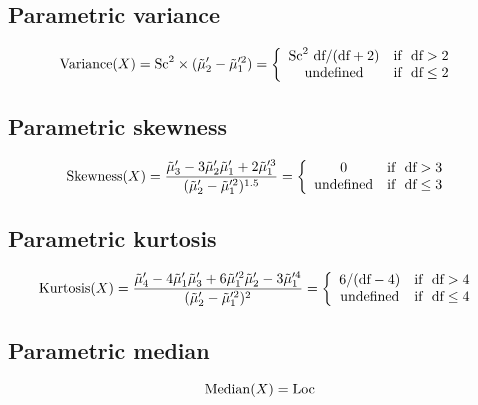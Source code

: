 \documentclass{article}
\begin{document}
\subsection{Parametric variance}
\begin{equation*} \mathrm{Variance}(X)=\text{Sc}^{2}\times (\tilde{\mu}'_{2}-\tilde{\mu}'^{2}_{1})=\left\{\begin{array}{cl} \text{Sc}^{2} \ \text{df}/(\text{df}+2) & \text{if } \ \text{df} > 2 \\ \text{undefined} & \text{if } \  \text{df} \leq 2 \end{array} \right.\\ \end{equation*}
\subsection{Parametric skewness}
\begin{equation*} \mathrm{Skewness}(X)=\frac{\tilde{\mu}'_{3}-3\tilde{\mu}'_{2}\tilde{\mu}'_{1}+2\tilde{\mu}'^{3}_{1}}{(\tilde{\mu}'_{2}-\tilde{\mu}'^{2}_{1})^{1.5}}=\left\{\begin{array}{cl} 0 & \text{if } \ \text{df} > 3 \\ \text{undefined} & \text{if } \  \text{df} \leq 3 \end{array} \right.\\ \end{equation*}
\subsection{Parametric kurtosis}
\begin{equation*} \mathrm{Kurtosis}(X)=\frac{\tilde{\mu}'_{4}-4\tilde{\mu}'_{1}\tilde{\mu}'_{3}+6\tilde{\mu}'^{2}_{1}\tilde{\mu}'_{2}-3\tilde{\mu}'^{4}_{1}}{(\tilde{\mu}'_{2}-\tilde{\mu}'^{2}_{1})^{2}}=\left\{\begin{array}{cl} 6/(\text{df}-4) & \text{if } \ \text{df} > 4 \\ \text{undefined} & \text{if } \ \text{df} \leq 4 \end{array} \right.\\ \end{equation*}
\subsection{Parametric median}
\begin{equation*} \mathrm{Median}(X)=\text{Loc}\\ \end{equation*}
\end{document}
